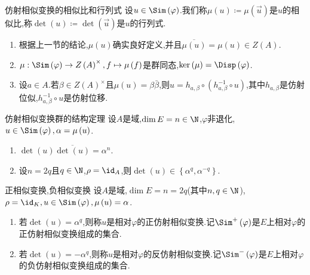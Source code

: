 \begin{definition}{仿射相似变换的相似比和行列式}{}
	设$u\in\Sim\left(\varphi\right)$.我们称$\mu\left(u\right)\coloneq\mu\left(\vec{u}\right)$是$u$的相似比,称$\det\left(u\right)\coloneq\det\left(\vec{u}\right)$是$u$的行列式.
\end{definition}

\begin{remark}{}{}
	\begin{enumerate}
		\item 根据上一节的结论,$\mu\left(u\right)$确实良好定义,并且$\overline{\mu\left(u\right)}=\mu\left(u\right)\in Z\left(A\right)$.
		\item $\mu:\Sim\left(\varphi\right)\to Z\left(A\right)^{\times},f\mapsto\mu\left(f\right)$是群同态,$\ker\left(\mu\right)=\Disp\left(\varphi\right)$.
		\item 设$a\in A$.若$\beta\in Z\left(A\right)^{\times}$且$\mu\left(u\right)=\beta\bar{\beta}$,则$u=h_{a,\beta}\circ\left(h_{a,\beta}^{-1}\circ u\right)$,其中$h_{a,\beta}$是仿射位似,$h_{a,\beta}^{-1}\circ u$是仿射位移.
	\end{enumerate}
\end{remark}

\begin{theorem}{仿射相似变换群的结构定理}{}
	设$A$是域,$\dim E=n\in\N$,$\varphi$非退化,$u\in\Sim\left(\varphi\right),\alpha=\mu\left(u\right)$.
	\begin{enumerate}
		\item $\det\left(u\right)\overline{\det\left(u\right)}=\alpha^{n}$.
		\item 设$n=2q$且$q\in\N$,$\rho=\id_{A}$,则$\det\left(u\right)\in\left\{\alpha^{q},\alpha^{-q}\right\}$.
	\end{enumerate}
\end{theorem}

\begin{definition}{正相似变换,负相似变换}{}
	设$A$是域,$\dim E=n=2q$(其中$n,q\in\N$),$\rho=\id_{K},u\in\Sim\left(\varphi\right),\mu\left(u\right)=\alpha$.
	\begin{enumerate}
		\item 若$\det\left(u\right)=\alpha^{q}$,则称$u$是相对$\varphi$的正仿射相似变换.记$\Sim^{+}\left(\varphi\right)$是$E$上相对$\varphi$的正仿射相似变换组成的集合.
		\item 若$\det\left(u\right)=-\alpha^{q}$,则称$u$是相对$\varphi$的反仿射相似变换.记$\Sim^{-}\left(\varphi\right)$是$E$上相对$\varphi$的负仿射相似变换组成的集合.
	\end{enumerate}
\end{definition}

